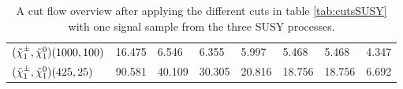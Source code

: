 \begin{landscape}
\begin{table}[H]
\begin{tabular}{l l l l l l l l}
        $(\Tilde{\chi}_1^\pm, \Tilde{\chi}_1^0) (1000, 100)$ & 16.475 & 6.546 & 6.355 & 5.997 & 5.468 & 5.468 & 4.347\\
        $(\Tilde{\chi}_1^\pm, \Tilde{\chi}_1^0) (425,25)$ & 90.581 & 40.109 & 30.305 & 20.816 & 18.756 & 18.756 & 6.692\\
    \bottomrule
    \end{tabular}
    \caption{A cut flow overview after applying the different cuts in table \ref{tab:cutsSUSY} with one signal sample from the three SUSY processes.}
    \label{tab:cutflowSUSY}
\end{table}
\end{landscape}

